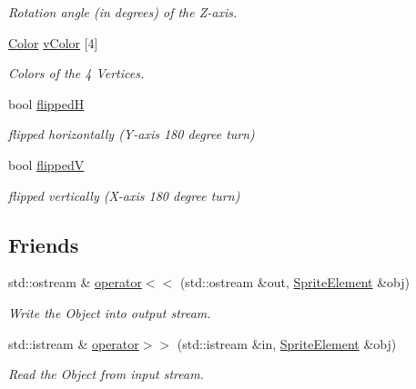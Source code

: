 \begin{DoxyCompactItemize}
\begin{DoxyCompactList}\small\item\em Rotation angle (in degrees) of the Z-\/axis. \item\end{DoxyCompactList}\item 
\hyperlink{class_f2_c_1_1_color}{Color} \hyperlink{class_f2_c_1_1_sprite_element_ad6fa2c39e687e33c0dd98b7003f048b9}{vColor} \mbox{[}4\mbox{]}
\begin{DoxyCompactList}\small\item\em Colors of the 4 Vertices. \item\end{DoxyCompactList}\item 
\hypertarget{class_f2_c_1_1_sprite_element_ada0bc808c37c5f774d7be60436ba726c}{
bool \hyperlink{class_f2_c_1_1_sprite_element_ada0bc808c37c5f774d7be60436ba726c}{flippedH}}
\label{class_f2_c_1_1_sprite_element_ada0bc808c37c5f774d7be60436ba726c}

\begin{DoxyCompactList}\small\item\em flipped horizontally (Y-\/axis 180 degree turn) \item\end{DoxyCompactList}\item 
\hypertarget{class_f2_c_1_1_sprite_element_a0449a2031f666d9703499fa72a6d0524}{
bool \hyperlink{class_f2_c_1_1_sprite_element_a0449a2031f666d9703499fa72a6d0524}{flippedV}}
\label{class_f2_c_1_1_sprite_element_a0449a2031f666d9703499fa72a6d0524}

\begin{DoxyCompactList}\small\item\em flipped vertically (X-\/axis 180 degree turn) \item\end{DoxyCompactList}\end{DoxyCompactItemize}
\subsection*{Friends}
\begin{DoxyCompactItemize}
\item 
std::ostream \& \hyperlink{class_f2_c_1_1_sprite_element_aff42b83c97e7575fa2a700b4e93ed984}{operator$<$$<$} (std::ostream \&out, \hyperlink{class_f2_c_1_1_sprite_element}{SpriteElement} \&obj)
\begin{DoxyCompactList}\small\item\em Write the Object into output stream. \item\end{DoxyCompactList}\item 
std::istream \& \hyperlink{class_f2_c_1_1_sprite_element_ac50e73aa6b3fda63726c661014213dd1}{operator$>$$>$} (std::istream \&in, \hyperlink{class_f2_c_1_1_sprite_element}{SpriteElement} \&obj)
\begin{DoxyCompactList}\small\item\em Read the Object from input stream. \item\end{DoxyCompactList}\end{DoxyCompactItemize}


